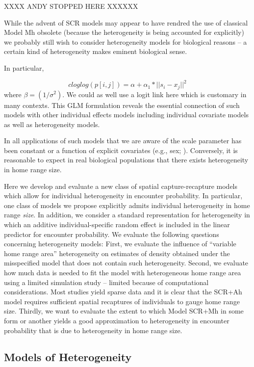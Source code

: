 XXXX ANDY STOPPED HERE XXXXXX

While the advent of SCR models may appear to have rendred the use of
classical Model Mh obsolete (because the heterogeneity is being
accounted for explicitly) we probably still wish to consider
heterogeneity models for biological reasons -- 
 a certain kind of heterogeneity
makes eminent biological sense.

In particular, 

\[  
 cloglog(p[i,j]) = \alpha + \alpha_1*||s_{i} - x_{j}||^2 
\]
where $\beta = (1/\sigma^{2})$.  We could as well use a logit link
here which is customary in many contexts.  This GLM formulation
reveals the essential connection of such models with other individual
effects models including individual covariate models as well as
heterogeneity models.

In all applications of such models that we are aware of the scale
parameter has been constant or a function of explicit covariates
(e.g., sex; \citet{gardner_etal:2010}). Conversely, it is reasonable
to expect in real biological populations that there exists
heterogeneity in home range size.
  
Here we develop and evaluate a new class of spatial capture-recapture
models which allow for individual heterogeneity in encounter
probability.  In particular, one class of models we propose explicitly
admits individual heterogeneity in home range {\it size}. In addition,
we consider a standard representation for heterogeneity in which an
additive individual-specific random effect is included in the linear
predictor for encounter probability.  We evaluate the following
questions concerning heterogeneity models: First, we evaluate the
influence of ``variable home range area'' heterogeneity on estimates
of density obtained under the misspecified model that does not contain
such heterogeneity.  Second, we evaluate how much data is needed to
fit the model with heterogeneous home range area using a limited
simulation study -- limited because of computational considerations.
Most studies yield sparse data and it is clear that the SCR+Ah model
requires sufficient spatial recaptures of individuals to gauge home
range size.  Thirdly, we want to evaluate the extent to which Model
SCR+Mh in some form or another yields a good approximation to
heterogeneity in encounter probability that is due to heterogeneity in
home range size.

\subsection{Models of Heterogeneity}

